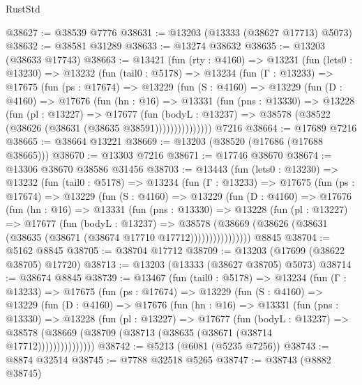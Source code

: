 \begin{lexlean}{RustStd}
\begin{coremodule}
@38627 := @38539 @7776
@38631 := @13203 (@13333 (@38627 @17713) @5073)
@38632 := @38581 @31289
@38633 := @13274 @38632
@38635 := @13203 (@38633 @17743)
@38663 := @13421
    (fun (rty : @4160) =>
    @13231
      (fun (lets0 : @13230) =>
      @13232
        (fun (tail0 : @5178) =>
        @13234
          (fun (Γ : @13233) =>
          @17675
            (fun (ps : @17674) =>
            @13229
              (fun (S : @4160) =>
              @13229
                (fun (D : @4160) =>
                @17676
                  (fun (hn : @16) =>
                  @13331
                    (fun (pns : @13330) =>
                    @13228
                      (fun (pl : @13227) =>
                      @17677
                        (fun (bodyL : @13237) =>
                        @38578 (@38522 (@38626 (@38631 (@38635 @38591)))))))))))))))
    @7216
@38664 := @17689 @7216
@38665 := @38664 @13221
@38669 := @13203 (@38520 (@17686 (@17688 @38665)))
@38670 := @13303 @7216
@38671 := @17746 @38670
@38674 := @13306 @38670 @38586 @31456
@38703 := @13443
    (fun (lets0 : @13230) =>
    @13232
      (fun (tail0 : @5178) =>
      @13234
        (fun (Γ : @13233) =>
        @17675
          (fun (ps : @17674) =>
          @13229
            (fun (S : @4160) =>
            @13229
              (fun (D : @4160) =>
              @17676
                (fun (hn : @16) =>
                @13331
                  (fun (pns : @13330) =>
                  @13228
                    (fun (pl : @13227) =>
                    @17677
                      (fun (bodyL : @13237) =>
                      @38578
                        (@38669
                          (@38626 (@38631 (@38635 (@38671 (@38674 @17710 @17712))))))))))))))))
    @8845
@38704 := @5162 @8845
@38705 := @38704 @17712
@38709 := @13203 (@17699 (@38622 @38705) @17720)
@38713 := @13203 (@13333 (@38627 @38705) @5073)
@38714 := @38674 @8845
@38739 := @13467
    (fun (tail0 : @5178) =>
    @13234
      (fun (Γ : @13233) =>
      @17675
        (fun (ps : @17674) =>
        @13229
          (fun (S : @4160) =>
          @13229
            (fun (D : @4160) =>
            @17676
              (fun (hn : @16) =>
              @13331
                (fun (pns : @13330) =>
                @13228
                  (fun (pl : @13227) =>
                  @17677
                    (fun (bodyL : @13237) =>
                    @38578 (@38669 (@38709 (@38713 (@38635 (@38671 (@38714 @17712)))))))))))))))
@38742 := @5213 (@6081 (@5235 @7256))
@38743 := @8874 @32514
@38745 := @7788 @32518 @5265
@38747 := @38743 (@8882 @38745)

\end{coremodule}
\end{lexlean}
